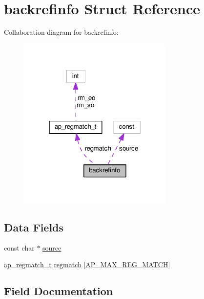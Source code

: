 \hypertarget{structbackrefinfo}{}\section{backrefinfo Struct Reference}
\label{structbackrefinfo}


Collaboration diagram for backrefinfo\+:
\nopagebreak
\begin{figure}[H]
\begin{center}
\leavevmode
\includegraphics[width=220pt]{structbackrefinfo__coll__graph}
\end{center}
\end{figure}
\subsection*{Data Fields}
\begin{DoxyCompactItemize}
\item 
const char $\ast$ \hyperlink{structbackrefinfo_a0f12e2e2929e64a0beb224ed28c988ea}{source}
\item 
\hyperlink{structap__regmatch__t}{ap\+\_\+regmatch\+\_\+t} \hyperlink{structbackrefinfo_ab9e9fc7fdcbb9ff2cd7dc42d3a8d393f}{regmatch} \mbox{[}\hyperlink{group__APACHE__CORE__DAEMON_ga7cc324c99d14a68ba7c8d1aae306a8d8}{A\+P\+\_\+\+M\+A\+X\+\_\+\+R\+E\+G\+\_\+\+M\+A\+T\+CH}\mbox{]}
\end{DoxyCompactItemize}


\subsection{Field Documentation}
